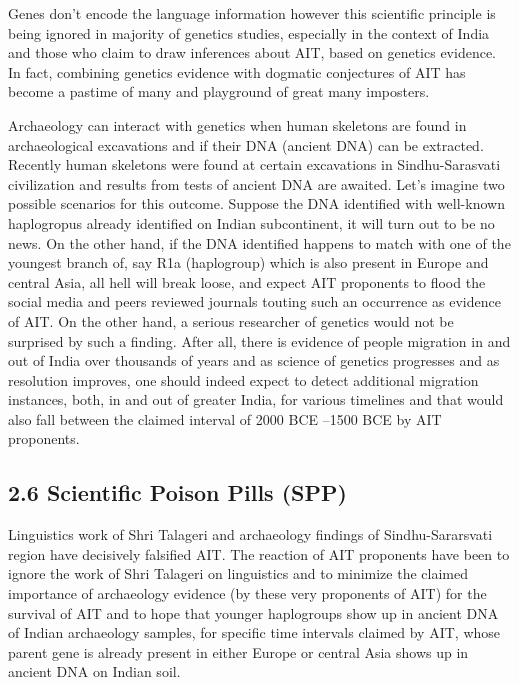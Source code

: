 Genes don’t encode the language information however this scientific principle is being ignored in majority of genetics studies, especially in the context of India and those who claim to draw inferences about AIT, based on genetics evidence. In fact, combining genetics evidence with dogmatic conjectures of AIT has become a pastime of many and playground of great many imposters.

Archaeology can interact with genetics when human skeletons are found in archaeological excavations and if their DNA (ancient DNA) can be extracted. Recently human skeletons were found at certain excavations in Sindhu-Sarasvati civilization and results from tests of ancient DNA are awaited. Let’s imagine two possible scenarios for this outcome. Suppose the DNA identified with well-known haplogropus already identified on Indian subcontinent, it will turn out to be no news. On the other hand, if the DNA identified happens to match with one of the youngest branch of, say R1a (haplogroup) which is also present in Europe and central Asia, all hell will break loose, and expect AIT proponents to flood the social media and peers reviewed journals touting such an occurrence as evidence of AIT. On the other hand, a serious researcher of genetics would not be surprised by such a finding. After all, there is evidence of people migration in and out of India over thousands of years and as science of genetics progresses and as resolution improves, one should indeed expect to detect additional migration instances, both, in and out of greater India, for various timelines and that would also fall between the claimed interval of 2000 BCE –1500 BCE by AIT proponents.


\subsection*{2.6 Scientific Poison Pills (SPP)}

Linguistics work of Shri Talageri and archaeology findings of Sindhu-Sararsvati region have decisively falsified AIT. The reaction of AIT proponents have been to ignore the work of Shri Talageri on linguistics and to minimize the claimed importance of archaeology evidence (by these very proponents of AIT) for the survival of AIT and to hope that younger haplogroups show up in ancient DNA of Indian archaeology samples, for specific time intervals claimed by AIT, whose parent gene is already present in either Europe or central Asia shows up in ancient DNA on Indian soil.

\newpage

